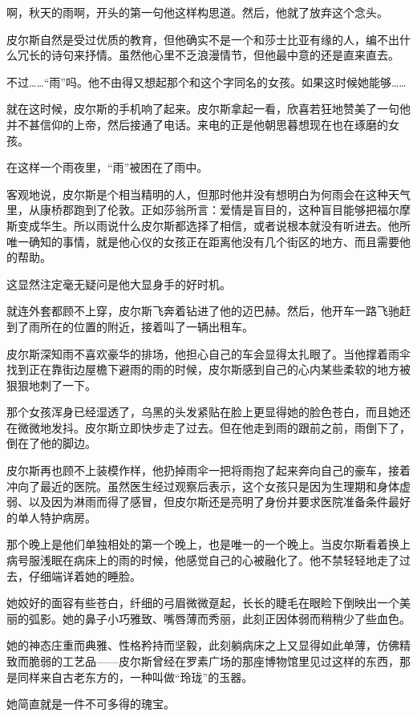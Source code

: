 啊，秋天的雨啊，开头的第一句他这样构思道。然后，他就了放弃这个念头。

皮尔斯自然是受过优质的教育，但他确实不是一个和莎士比亚有缘的人，编不出什么冗长的诗句来抒情。虽然他心里不乏浪漫情节，但他最中意的还是直来直去。

不过……“雨”吗。他不由得又想起那个和这个字同名的女孩。如果这时候她能够……

就在这时候，皮尔斯的手机响了起来。皮尔斯拿起一看，欣喜若狂地赞美了一句他并不甚信仰的上帝，然后接通了电话。来电的正是他朝思暮想现在也在琢磨的女孩。

在这样一个雨夜里，“雨”被困在了雨中。

客观地说，皮尔斯是个相当精明的人，但那时他并没有想明白为何雨会在这种天气里，从康桥郡跑到了伦敦。正如莎翁所言：爱情是盲目的，这种盲目能够把福尔摩斯变成华生。所以雨说什么皮尔斯都选择了相信，或者说根本就没有听进去。他所唯一确知的事情，就是他心仪的女孩正在距离他没有几个街区的地方、而且需要他的帮助。

这显然注定毫无疑问是他大显身手的好时机。

就连外套都顾不上穿，皮尔斯飞奔着钻进了他的迈巴赫。然后，他开车一路飞驰赶到了雨所在的位置的附近，接着叫了一辆出租车。

皮尔斯深知雨不喜欢豪华的排场，他担心自己的车会显得太扎眼了。当他撑着雨伞找到正在靠街边屋檐下避雨的雨的时候，皮尔斯感到自己的心内某些柔软的地方被狠狠地刺了一下。

那个女孩浑身已经湿透了，乌黑的头发紧贴在脸上更显得她的脸色苍白，而且她还在微微地发抖。皮尔斯立即快步走了过去。但在他走到雨的跟前之前，雨倒下了，倒在了他的脚边。

皮尔斯再也顾不上装模作样，他扔掉雨伞一把将雨抱了起来奔向自己的豪车，接着冲向了最近的医院。虽然医生经过观察后表示，这个女孩只是因为生理期和身体虚弱、以及因为淋雨而得了感冒，但皮尔斯还是亮明了身份并要求医院准备条件最好的单人特护病房。

那个晚上是他们单独相处的第一个晚上，也是唯一的一个晚上。当皮尔斯看着换上病号服浅眠在病床上的雨的时候，他感觉自己的心被融化了。他不禁轻轻地走了过去，仔细端详着她的睡脸。

她姣好的面容有些苍白，纤细的弓眉微微趸起，长长的睫毛在眼睑下倒映出一个美丽的弧影。她的鼻子小巧雅致、嘴唇薄而秀丽，此刻正因体弱而稍稍少了些血色。

她的神态庄重而典雅、性格矜持而坚毅，此刻躺病床之上又显得如此单薄，仿佛精致而脆弱的工艺品——皮尔斯曾经在罗素广场的那座博物馆里见过这样的东西，那是同样来自古老东方的，一种叫做“玲珑”的玉器。

她简直就是一件不可多得的瑰宝。

